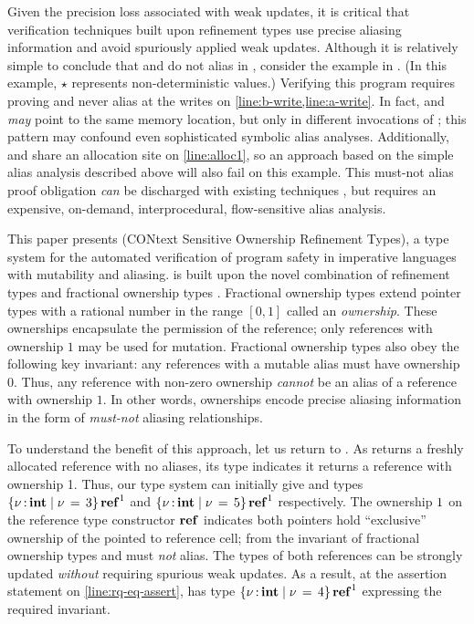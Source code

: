 Given the precision loss associated with weak updates,
it is critical that verification techniques built upon
refinement types use precise aliasing information and
avoid spuriously applied weak updates. Although it
is relatively simple to conclude that  and 
do not alias in , consider
the example in . (In this example,
$\star$ represents non-deterministic values.) Verifying
this program requires proving  and  never
alias at the writes on \cref{line:b-write,line:a-write}.
In fact,  and  \emph{may} point to the same
memory location, but only in different invocations of ;
this pattern may confound even sophisticated symbolic alias analyses.
Additionally,  and  share an allocation site on \cref{line:alloc1},
so an approach based on the simple alias analysis described above will also fail on
this example. This must-not alias proof obligation  \emph{can} be discharged with existing
techniques \cite{spath2016boomerang,spath2019context}, but requires an expensive, on-demand,
interprocedural, flow-sensitive alias analysis. 

This paper presents \name (CONtext Sensitive Ownership Refinement Types),
a type system for the automated verification
of program safety in imperative languages with mutability and aliasing.
\name is built upon the novel combination of refinement types and
fractional ownership types \cite{suenaga2009fractional,suenaga2012type}.
Fractional ownership types extend pointer types with a rational number in
the range $[0,1]$ called an \emph{ownership}.
These ownerships encapsulate the permission of the reference; only
references with ownership $1$ may be used for mutation. Fractional ownership
types also obey the following key invariant: any references with a mutable
alias must have ownership 0.
Thus, any reference with non-zero ownership \emph{cannot}
be an alias of a reference with ownership $1$. In other words,
ownerships encode precise aliasing information in the form of
\emph{must-not} aliasing relationships.

To understand the benefit of this approach, let us return to
. As  returns a freshly allocated
reference with no aliases, its type indicates it returns a
reference with ownership 1. Thus, our type system can initially
give  and  types $  \left\{{  \nu  \operatorname{:} \mathbf{int} \mid  \nu \, = \, 3 }\right\}   \operatorname{\mathbf{ref}}^{ 1 } $ and $  \left\{{  \nu  \operatorname{:} \mathbf{int} \mid  \nu \, = \, 5 }\right\}   \operatorname{\mathbf{ref}}^{ 1 } $ respectively. The ownership $1$ on the reference type constructor $\operatorname{\mathbf{ref}}$ indicates both
pointers hold ``exclusive'' ownership of the pointed to reference cell;
from the invariant of fractional ownership types  and 
must \emph{not} alias. The types of both references
can be strongly updated \emph{without} requiring spurious weak updates. As a result,
at the assertion statement on \cref{line:rq-eq-assert},  has type
$  \left\{{  \nu  \operatorname{:} \mathbf{int} \mid  \nu \, = \, 4 }\right\}   \operatorname{\mathbf{ref}}^{ 1 } $ expressing the required invariant.

